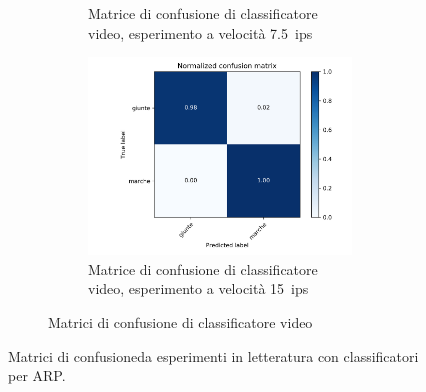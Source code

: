 \begin{figure}[h]
\begin{minipage}{\textwidth}
\begin{subfigure}{0.9\textwidth}
\begin{subfigure}{0.49\textwidth}
                \caption{Matrice di confusione di classificatore video, esperimento a velocità \qty{7,5}{ips}}
                \label{fig:confusion-matrix-video-classification-7dot5ips-tape}
            \end{subfigure}
            \hfill
            \begin{subfigure}{0.49\textwidth}
                \centering
                \includegraphics[width=\textwidth]{img/confusion-matrix-video-classification-15ips-tape.png}
                \caption{Matrice di confusione di classificatore video, esperimento a velocità \qty{15}{ips}}
                \label{fig:confusion-matrix-video-classification-15ips-tape}
            \end{subfigure}
            \caption{Matrici di confusione di classificatore video \cite[fig. 4.11]{gravaTesiVideoAnalyser2019}}
            \label{fig:confusion-matrix-video-classification}
         \end{subfigure}
            \caption[Matrici di confusione da esperimenti in letteratura con classificatori per \ac{ARP}.]{Matrici di confusione\footnotemark da esperimenti in letteratura con classificatori per \ac{ARP}.}
            \label{fig:confusion-matrix-audio-video}
        \mpfootnotes
    \end{minipage}
\end{figure}

